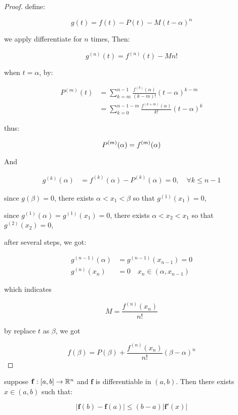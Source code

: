 \begin{proof}
    define:

    \[
        g(t) = f(t) - P(t) - M(t-\alpha)^n
    \]

    we apply differentiate for $n$ times, Then:

    \[
        g^{(n)}(t)= f^{(n)}(t) - Mn!
    \]

    when $t = \alpha$, by:

    \begin{align*}
        P^{(m)}(t) &= \sum_{k=m}^{n-1} \frac{f^{(k)}(\alpha)}{(k-m)!}(t-\alpha)^{k-m} \\
        &= \sum_{k=0}^{n-1-m} \frac{f^{(k+m)}(\alpha)}{k!}(t-\alpha)^{k}
    \end{align*}

    thus:

    \[
        P^{(m)}(\alpha) = f^{(m)}(\alpha) \\
    \]

    And

    \begin{align*}
        g^{(k)}(\alpha) &= f^{(k)}(\alpha) - P^{(k)}(\alpha) = 0,\quad \forall k \le n-1
    \end{align*}

    since $g(\beta) = 0$, there exists $\alpha < x_1 < \beta$ so that $g^{(1)}(x_1) = 0$,

    since $g^{(1)}(\alpha) = g^{(1)}(x_1) = 0$, there exists $\alpha < x_2 < x_1$ so that $g^{(2)}(x_2) = 0$,

    after several steps, we got:

    \begin{align*}
        g^{(n-1)}(\alpha) &= g^{(n-1)}(x_{n-1}) = 0 \\
        g^{(n)}(x_n) &= 0 \quad x_n \in (\alpha, x_{n-1})
    \end{align*}

    which indicates

    \[
        M = \frac{f^{(n)}(x_n)}{n!}
    \]

    by replace $t$ as $\beta$, we got

    \[
        f(\beta) = P(\beta) + \frac{f^{(n)}(x_n)}{n!}(\beta - \alpha)^n
    \]
\end{proof}


\begin{thm}
    suppose $\mathbf{f}: [a,b] \to \mathbb{R}^n$ and $\mathbf{f}$ is differentiable
    in $(a,b)$. Then there exists $x \in (a,b)$ such that:

    \[
        \left| \mathbf{f}(b) - \mathbf{f}(a)\right| \le (b-a) \left| \mathbf{f}'(x) \right|
    \]
\end{thm}

